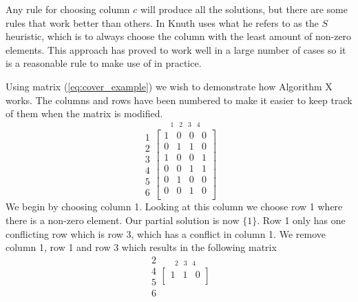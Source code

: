 Any rule for choosing column $c$ will produce all the solutions, but there are some rules that work better than others.
In \cite{knuth00dancing} Knuth uses what he refers to as the $S$ heuristic, which is to always choose the column with the least amount of non-zero elements.
This approach has proved to work well in a large number of cases so it is a reasonable rule to make use of in practice.

\begin{example}
Using matrix (\ref{eq:cover_example}) we wish to demonstrate how Algorithm X works.
The columns and rows have been numbered to make it easier to keep track of them when the matrix is modified.
\begin{equation*}
	\label{eq:ces1}
	\begin{array}{r} 1\\ 2\\ 3\\ 4\\ 5\\ 6 \end{array}
	\stackrel{
		\begin{array}{cccc} 1 & 2 & 3 & 4 \end{array}
	}{
		\begin{bmatrix}
			1 & 0 & 0 & 0 \\
			0 & 1 & 1 & 0 \\
			1 & 0 & 0 & 1 \\
			0 & 0 & 1 & 1 \\
			0 & 1 & 0 & 0 \\
			0 & 0 & 1 & 0 \\
		\end{bmatrix}
	}
\end{equation*}
We begin by choosing column 1.
Looking at this column we choose row 1 where there is a non-zero element.
Our partial solution is now $\{ 1 \}$.
Row 1 only has one conflicting row which is row 3, which has a conflict in column 1.
We remove column 1, row 1 and row 3 which results in the following matrix
\begin{equation}
	\label{eq:ces2}
	\begin{array}{r} 2\\ 4\\ 5\\ 6 \end{array}
	\stackrel{
		\begin{array}{ccc} 2 & 3 & 4 \end{array}
	}{
		\begin{bmatrix}
			1 & 1 & 0 \\

\end{bmatrix}}
\end{equation}
\end{example}
